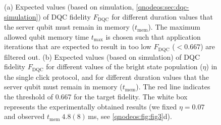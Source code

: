 \begin{figure}[p]
    \centering
    \hfill
    \caption{
        (a) Expected values (based on simulation, \cref{qnodeos:sec:dqc-simulation}) of \ac{DQC} fidelity $F_{\text{DQC}}$ for different duration values that the server qubit must remain in memory ($t_{\text{mem}}$). The maximum allowed qubit memory time $t_{\max}$ is chosen such that application iterations that are expected to result in too low $F_{\text{DQC}}$ ($<0.667$) are filtered out.
        (b) Expected values (based on simulation) of \ac{DQC} fidelity $F_{\text{DQC}}$ for different values of the bright state population ($\eta$) in the single click protocol, and for different duration values that the server qubit must remain in memory ($t_{\text{mem}}$). The red line indicates the threshold of 0.667 for the target fidelity. The white box represents the experimentally obtained results (we fixed $\eta = 0.07$ and observed $t_{\text{mem}} ~4.8(8)$\,ms, see \cref{qnodeos:fig:fig3}d).
    }
    \label{qnodeos:fig:delcomp-simulation}
\end{figure}

